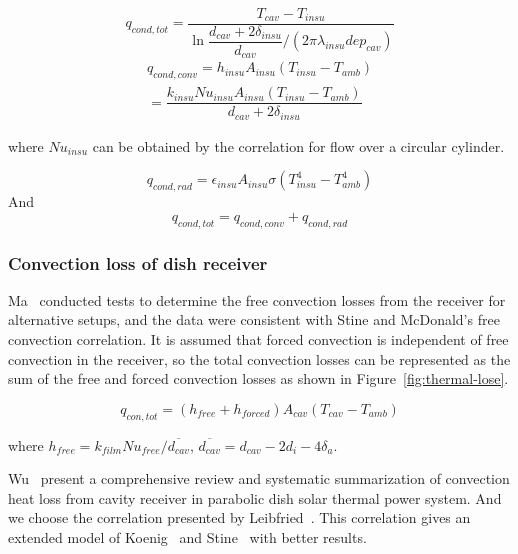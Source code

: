 \documentclass{article}
\begin{document}
\begin{equation*}
	q_{cond,tot}=\dfrac{T_{cav}-T_{insu}}{\ln\dfrac{d_{cav}+2\delta_{insu}}{d_{cav}}/(2\pi\lambda_{insu}dep_{cav})}
\end{equation*}
\begin{equation*}
\begin{split}
	q_{cond,conv}=h_{insu}A_{insu}(T_{insu}-T_{amb})
	\\=\dfrac{k_{insu}Nu_{insu}A_{insu}(T_{insu}-T_{amb})}{d_{cav}+2\delta_{insu}}
\end{split}
\end{equation*}

where $Nu_{insu}$ can be obtained by the correlation for flow over a circular cylinder.~\cite{Churchill1977} 

\begin{equation*}
	q_{cond,rad}=\epsilon_{insu}A_{insu}\sigma(T_{insu}^4 - T_{amb}^4)	
\end{equation*}
And 
\begin{equation*}
	q_{cond,tot}=q_{cond,conv}+q_{cond,rad}	
\end{equation*}

\subsubsection{Convection loss of dish receiver}
Ma~\cite{Ma1993} conducted tests to determine the free convection losses from the receiver for alternative setups, and the data were consistent with Stine and McDonald's free convection correlation. It is assumed that forced convection is independent of free convection in the receiver, so the total convection losses can be represented as the sum of the free and forced convection losses as shown in Figure~\ref{fig:thermal-lose}.

\begin{equation*}
	q_{con,tot} = (h_{free} + h_{forced})A_{cav}(T_{cav}-T_{amb})
\end{equation*}


where $h_{free}=k_{film}Nu_{free}/\overline{d_{cav}}$, $\overline{d_{cav}}=d_{cav}-2d_i-4 \delta_a$.

Wu~\cite{Wu2010} present a comprehensive review and systematic summarization of convection heat loss from cavity receiver in parabolic dish solar thermal power system. And we choose the correlation presented by Leibfried~\cite{Leibfried1995}. This correlation gives an extended model of Koenig~\cite{Koenig1981} and Stine~\cite{Stine1994} with better results.
\end{document}
